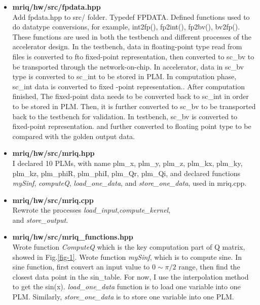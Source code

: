 \begin{itemize}

\item \textbf{mriq/hw/src/fpdata.hpp} \\
    Add fpdata.hpp to src/ folder. Typedef FPDATA. Defined functions used to do datatype conversions, for example, int2fp(), fp2int(), fp2bv(), bv2fp(). These functions are used in both the testbench and different processes of the accelerator design. In the testbench, data in floating-point type read from files is converted to fto fixed-point representation, then converted to sc\_bv to be transported through the network-on-chip. In accelerator, data in sc\_bv  type is converted to sc\_int to be stored in PLM. In computation phase, sc\_int data is converted to fixed -point representation.. After computation finished, The fixed-point data needs to be converted back to sc\_int in order to be stored in PLM. Then, it is further converted to sc\_bv to be transported back to the testbench for validation. In testbench, sc\_bv is converted to fixed-point representation. and further converted to floating point type to be compared with the golden output data.

    \item \textbf{mriq/hw/src/mriq.hpp} \\
    I declared 10 PLMs, with name plm\_x, plm\_y, plm\_z, plm\_kx, plm\_ky, plm\_kz,  plm\_phiR, plm\_phiI, plm\_Qr,  plm\_Qi, and declared functions \textit{mySinf}, \textit{computeQ}, \textit{load\_one\_data}, and \textit{store\_one\_data}, used in mriq.cpp.

    \item \textbf{mriq/hw/src/mriq.cpp} \\
Rewrote the processes \textit{load\_input},\textit{compute\_kernel}, \\
and  \textit{store\_output}. 

\item \textbf{mriq/hw/src/mriq\_functions.hpp} \\
    Wrote function \textit{ComputeQ} which is the key computation part of Q matrix, showed in Fig.\ref{fig-1}. Wrote function \textit{mySinf}, which is to compute sine. In sine function, first convert an input value to $0\sim \pi/2$ range, then find the closest data point in the sin\_table. For now, I use the interpolation method to get the sin(x). \textit{load\_one\_data} function is to load one variable into one PLM. Similarly, \textit{store\_one\_data} is to store one variable into one PLM.


\end{itemize}

